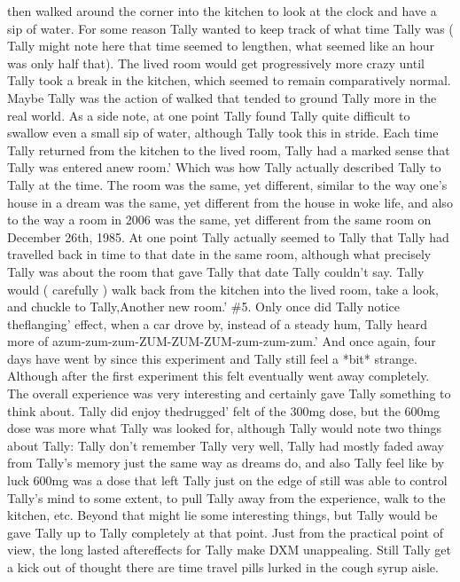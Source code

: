 \documentclass[12pt]{book}
\begin{document}
then walked around the corner into the kitchen to look at the clock and have a sip of water. For some reason Tally wanted to keep track of what time Tally was ( Tally might note here that time seemed to lengthen, what seemed like an hour was only half that). The lived room would get progressively more crazy until Tally took a break in the kitchen, which seemed to remain comparatively normal. Maybe Tally was the action of walked that tended to ground Tally more in the real world. As a side note, at one point Tally found Tally quite difficult to swallow even a small sip of water, although Tally took this in stride. Each time Tally returned from the kitchen to the lived room, Tally had a marked sense that Tally was entered anew room.' Which was how Tally actually described Tally to Tally at the time. The room was the same, yet different, similar to the way one's house in a dream was the same, yet different from the house in woke life, and also to the way a room in 2006 was the same, yet different from the same room on December 26th, 1985. At one point Tally actually seemed to Tally that Tally had travelled back in time to that date in the same room, although what precisely Tally was about the room that gave Tally that date Tally couldn't say. Tally would ( carefully ) walk back from the kitchen into the lived room, take a look, and chuckle to Tally,Another new room.' \#5. Only once did Tally notice theflanging' effect, when a car drove by, instead of a steady hum, Tally heard more of azum-zum-zum-ZUM-ZUM-ZUM-zum-zum-zum.' And once again, four days have went by since this experiment and Tally still feel a *bit* strange. Although after the first experiment this felt eventually went away completely. The overall experience was very interesting and certainly gave Tally something to think about. Tally did enjoy thedrugged' felt of the 300mg dose, but the 600mg dose was more what Tally was looked for, although Tally would note two things about Tally: Tally don't remember Tally very well, Tally had mostly faded away from Tally's memory just the same way as dreams do, and also Tally feel like by luck 600mg was a dose that left Tally just on the edge of still was able to control Tally's mind to some extent, to pull Tally away from the experience, walk to the kitchen, etc. Beyond that might lie some interesting things, but Tally would be gave Tally up to Tally completely at that point. Just from the practical point of view, the long lasted aftereffects for Tally make DXM unappealing. Still Tally get a kick out of thought there are time travel pills lurked in the cough syrup aisle.
\end{document}
